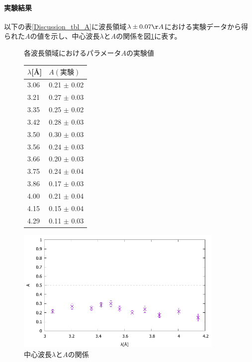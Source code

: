 \paragraph{実験結果}
以下の表\ref{Discussion_tbl_A}に波長領域$\lambda \pm 0.07 \AA$における実験データから得られた$A$の値を示し、中心波長$\lambda$と$A$の関係を図\ref{Discussion_fig_A}に表す。
\begin{figure}[H]
\begin{minipage}{0.35\hsize}
\centering
\makeatletter
\def\@captype{table}
\makeatother
\caption{各波長領域におけるパラメータ$A$の実験値} \label{Discussion_tbl_A}
\begin{tabular}{ll}
$\lambda$[\AA] &  $A(実験)$\\ \hline
3.06 	&	0.21 	$\pm$	0.02 	\\
3.21 	&	0.27 	$\pm$	0.03 	\\
3.35 	&	0.25 	$\pm$	0.02 	\\
3.42 	&	0.28 	$\pm$	0.03 	\\
3.50 	&	0.30 	$\pm$	0.03 	\\
3.56 	&	0.24 	$\pm$	0.03 	\\
3.66 	&	0.20 	$\pm$	0.03 	\\
3.75 	&	0.24 	$\pm$	0.04 	\\
3.86 	&	0.17 	$\pm$	0.03 	\\
4.00 	&	0.21 	$\pm$	0.04 	\\
4.15 	&	0.15 	$\pm$	0.04 	\\
4.29 	&	0.11 	$\pm$	0.03 	\\ \hline
\end{tabular}
\end{minipage}
\begin{minipage}{0.65\hsize}
\centering
\vspace{2.5cm}
\includegraphics[width=10cm]{discussion/A/A_F.pdf}
\caption{中心波長$\lambda$と$A$の関係} \label{Discussion_fig_A}
\end{minipage}
\end{figure}

